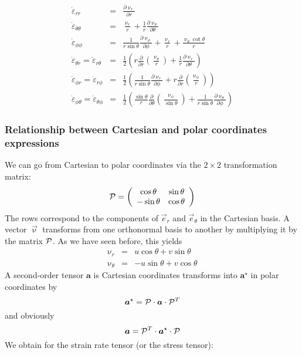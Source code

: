\begin{eqnarray}
\dot\varepsilon_{rr} 
&=& \frac{\partial \upnu_r}{\partial r} \\
\dot\varepsilon_{\theta\theta} 
&=& \frac{\upnu_r}{r} + \frac{1}{r} \frac{\partial \upnu_\theta}{\partial \theta}  \\
\dot\varepsilon_{\phi\phi} 
&=& \frac{1}{r \sin\theta} \frac{\partial \upnu_\phi}{\partial \phi} +
\frac{\upnu_r}{r} +\frac{\upnu_\theta \cot \theta}{r} \\
\dot\varepsilon_{\theta r} = \dot\varepsilon_{r\theta}   
&=& \frac{1}{2} \left( r \frac{\partial}{\partial r} (\frac{\upnu_\theta}{r} ) 
+\frac{1}{r} \frac{\partial \upnu_r}{\partial \theta} \right) \\
\dot\varepsilon_{\phi r} = \dot\varepsilon_{r\phi}      
&=&  \frac{1}{2} \left(  \frac{1}{r \sin\theta} \frac{\partial \upnu_r}{\partial \phi} 
+ r \frac{\partial }{\partial r} (\frac{\upnu_\phi}{r}) \right)  \\
\dot\varepsilon_{\phi \theta} = \dot\varepsilon_{\theta\phi} 
&=& \frac{1}{2} \left( \frac{\sin \theta}{r} \frac{\partial }{\partial \theta} (\frac{\upnu_\phi}{\sin\theta}) + \frac{1}{r \sin\theta} \frac{\partial \upnu_\theta}{\partial \phi}    \right) 
\end{eqnarray}



\subsubsection{Relationship between Cartesian and polar coordinates expressions}

We can go from Cartesian to polar coordinates  via the $2\times 2$ transformation matrix:
\begin{equation}
{\cal P}=
\left(
\begin{array}{ccc}
\cos\theta & \sin\theta \\
-\sin\theta & \cos\theta
\end{array}
\right)
\end{equation}
The rows correspond to the components of $\vec{e}_r$ and $\vec{e}_\theta$ in the Cartesian basis.
A vector $\vec{\upnu}$ transforms from one orthonormal basis to another by multiplying it by 
the matrix ${\cal P}$. As we have seen before, this yields
\begin{eqnarray}
\upnu_r &=& u \cos\theta + v \sin\theta \\
\upnu_\theta &=& -u \sin\theta + v \cos\theta
\end{eqnarray}
A second-order tensor ${\bm a}$ is Cartesian coordinates transforms into ${\bm a}^\star$
in polar coordinates by 
\[
{\bm a}^\star = {\cal P} \cdot {\bm a} \cdot {\cal P}^T
\]
and obviously 
\[
{\bm a} = {\cal P}^T \cdot {\bm a}^\star \cdot {\cal P}
\]
We obtain for the strain rate tensor (or the stress tensor):

